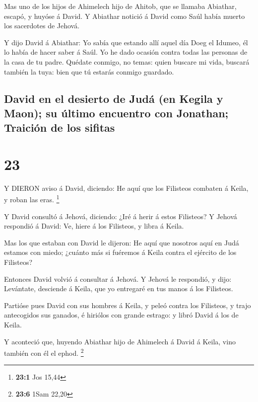  Mas uno de los hijos de Ahimelech hijo de Ahitob, que se
llamaba Abiathar, escapó, y huyóse á David.  Y Abiathar
notició á David como Saúl había muerto los sacerdotes de Jehová.

 Y dijo David á Abiathar: Yo sabía que estando allí aquel
día Doeg el Idumeo, él lo había de hacer saber á Saúl. Yo he dado
ocasión contra todas las personas de la casa de tu padre. 
Quédate conmigo, no temas: quien buscare mi vida, buscará también la
tuya: bien que tú estarás conmigo guardado.

\hypertarget{david-en-el-desierto-de-juduxe1-en-kegila-y-maon-su-uxfaltimo-encuentro-con-jonathan-traiciuxf3n-de-los-sifitas}{%
\subsection{David en el desierto de Judá (en Kegila y Maon); su último
encuentro con Jonathan; Traición de los
sifitas}\label{david-en-el-desierto-de-juduxe1-en-kegila-y-maon-su-uxfaltimo-encuentro-con-jonathan-traiciuxf3n-de-los-sifitas}}

\hypertarget{section-22}{%
\section{23}\label{section-22}}

 Y DIERON aviso á David, diciendo: He aquí que los Filisteos
combaten á Keila, y roban las eras. \footnote{\textbf{23:1} Jos 15,44}

 Y David consultó á Jehová, diciendo: ¿Iré á herir á estos
Filisteos? Y Jehová respondió á David: Ve, hiere á los Filisteos, y
libra á Keila.

 Mas los que estaban con David le dijeron: He aquí que
nosotros aquí en Judá estamos con miedo; ¿cuánto más si fuéremos á Keila
contra el ejército de los Filisteos?

 Entonces David volvió á consultar á Jehová. Y Jehová le
respondió, y dijo: Levántate, desciende á Keila, que yo entregaré en tus
manos á los Filisteos.

 Partióse pues David con sus hombres á Keila, y peleó contra
los Filisteos, y trajo antecogidos sus ganados, é hiriólos con grande
estrago: y libró David á los de Keila.

 Y aconteció que, huyendo Abiathar hijo de Ahimelech á David
á Keila, vino también con él el ephod. \footnote{\textbf{23:6} 1Sam
  22,20}

